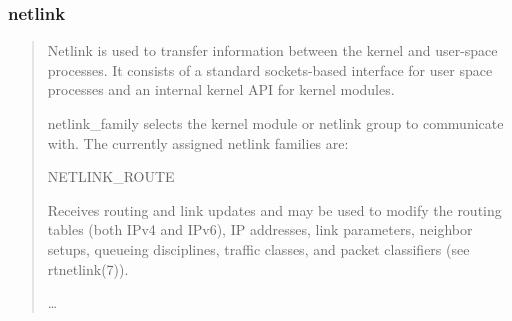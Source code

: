 \documentclass{ctexbeamer}
\begin{document}
\begin{frame}[fragile]
\frametitle{netlink}
\begin{quotation}
  Netlink is used to transfer information between the kernel and
  user-space processes. It consists of a standard sockets-based
  interface for user space processes and an internal kernel API for
  kernel modules.

  netlink\_family selects the kernel module or netlink group to
  communicate with. The currently assigned netlink families are:

  \begin{adjustwidth}{0.5cm}{}
    NETLINK\_ROUTE
  \end{adjustwidth}

  \begin{adjustwidth}{1cm}{}
    Receives routing and link updates and may be used to
    modify the routing tables (both IPv4 and IPv6), IP
    addresses, link parameters, neighbor setups, queueing
    disciplines, traffic classes, and packet classifiers (see
    rtnetlink(7)).
  \end{adjustwidth}

  \ldots
\end{quotation}
\end{frame}
\end{document}
